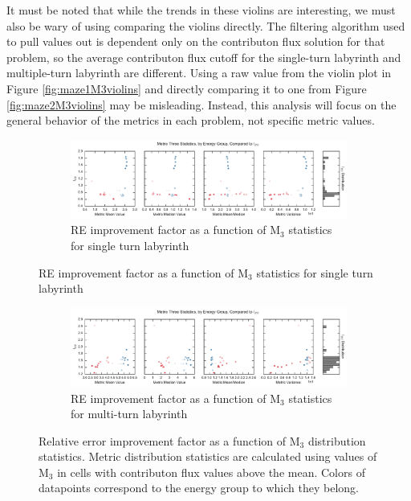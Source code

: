 It must be noted that while
the trends in these violins are interesting, we must also be wary of using comparing
the violins directly. The filtering algorithm used to pull values out is dependent only
on the contributon flux solution for that problem, so the average contributon
flux cutoff for the single-turn labyrinth and multiple-turn labyrinth are
different. Using a raw value from the violin plot in Figure
\ref{fig:maze1M3violins} and directly comparing it to one from Figure
\ref{fig:maze2M3violins} may be misleading. Instead, this analysis will focus on
the general behavior of the metrics in each problem, not specific metric values.

\begin{figure}[htb!]
  \centering
  \begin{subfigure}[t]{\textwidth}
    \includegraphics[width=\linewidth]{./chapters/characterization_probs/figures/char/maze2/metric_three_err_stats_mean.pdf}
    \caption{RE improvement factor as a function of M$_{3}$ statistics for single turn labyrinth}
    \label{fig:maze2M3errs}
  \end{subfigure}
\end{figure}
\begin{figure}[htb!]\ContinuedFloat
  \centering
  \begin{subfigure}[t]{\textwidth}
    \includegraphics[width=\linewidth]{./chapters/characterization_probs/figures/char/maze1/metric_three_err_stats_mean.pdf}
    \caption{RE improvement factor as a function of M$_3$ statistics for multi-turn labyrinth}
    \label{fig:maze1M3errs}
  \end{subfigure}
  \caption[Relative error improvement factor as a function of M$_3$
  distribution statistics.]
  {Relative error improvement factor as a function of M$_3$
  distribution statistics. Metric distribution statistics are calculated using
  values of M$_3$ in cells with contributon flux values above the mean. Colors
  of datapoints correspond to the energy group to which they belong.}
  \label{fig:labyrinthIREs}
\end{figure}

